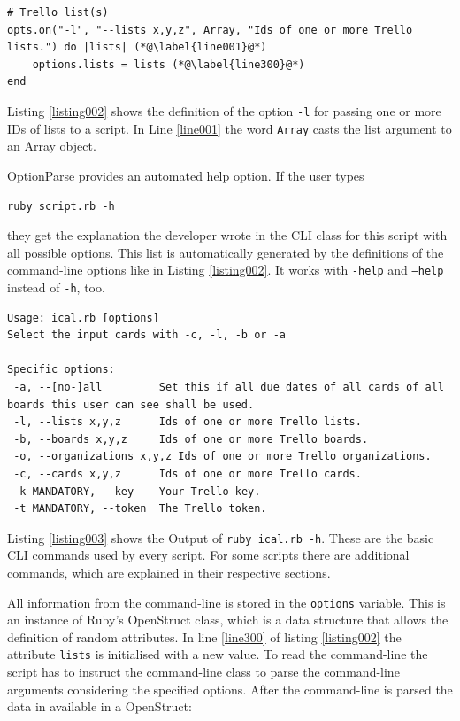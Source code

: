 \begin{lstlisting}[aboveskip=1\baselineskip, caption=Definition of a command-line option, label=listing002]
# Trello list(s)
opts.on("-l", "--lists x,y,z", Array, "Ids of one or more Trello lists.") do |lists| (*@\label{line001}@*)
	options.lists = lists (*@\label{line300}@*)
end
\end{lstlisting}

Listing \ref{listing002} shows the definition of the option \texttt{-l} for passing one or more IDs of lists to a script. In Line \ref{line001} the word \lstinline{Array} casts the list argument to an Array object.

OptionParse provides an automated help option. If the user types 
\begin{center}
\texttt{ruby script.rb -h} 
\end{center}
they get the explanation the developer wrote in the CLI class for this script with all possible options. This list is automatically generated by the definitions of the command-line options like in Listing \ref{listing002}. It works with \texttt{-help} and \texttt{--help} instead of \texttt{-h}, too.

\begin{lstlisting}[aboveskip=1\baselineskip, style=bash, caption=Output of the \texttt{-h} option., label=listing003]
Usage: ical.rb [options]
Select the input cards with -c, -l, -b or -a

Specific options:
 -a, --[no-]all         Set this if all due dates of all cards of all boards this user can see shall be used.
 -l, --lists x,y,z      Ids of one or more Trello lists.
 -b, --boards x,y,z     Ids of one or more Trello boards.
 -o, --organizations x,y,z Ids of one or more Trello organizations.
 -c, --cards x,y,z      Ids of one or more Trello cards.
 -k MANDATORY, --key    Your Trello key.
 -t MANDATORY, --token  The Trello token.
\end{lstlisting}

Listing \ref{listing003} shows the Output of \texttt{ruby ical.rb -h}. 
These are the basic CLI commands used by every script. For some scripts there are additional commands, which are explained in their respective sections.

All information from the command-line is stored in the \texttt{options} variable. This is an instance of Ruby's OpenStruct class, which is a data structure that allows the definition of random attributes. In line \ref{line300} of listing \ref{listing002} the attribute \texttt{lists} is initialised with a new value. \cite{ruby:openstruct} To read the command-line the script has to instruct the command-line class to parse the command-line arguments considering the specified options. After the command-line is parsed the data in available in a OpenStruct:

